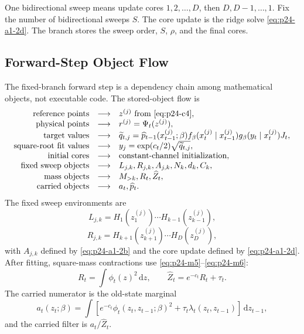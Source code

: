 \documentclass[11pt]{article}
\numberwithin{equation}{section}
\newcommand{\dd}{\,\mathrm d}
\begin{document}
One bidirectional sweep means update cores \(1,2,\ldots,D\), then
\(D,D-1,\ldots,1\).  Fix the number of bidirectional sweeps \(S\).  The core
update is the ridge solve \eqref{eq:p24-a1-2d}.  The branch stores the sweep order, \(S\),
\(\rho\), and the final cores.

\subsection{Forward-Step Object Flow}

The fixed-branch forward step is a dependency chain among mathematical
objects, not executable code.  The stored-object flow is
\begin{equation}
\begin{array}{rcl}
\text{reference points} &\longrightarrow& z^{(j)} \text{ from \eqref{eq:p24-c4}},\\
\text{physical points} &\longrightarrow& r^{(j)}=\Psi_t(z^{(j)}),\\
\text{target values} &\longrightarrow&
    \widetilde q_{t,j}
    =
    \widehat p_{t-1}(x_{t-1}^{(j)};\beta)
    f_\beta(x_t^{(j)}\mid x_{t-1}^{(j)})
    g_\beta(y_t\mid x_t^{(j)})J_t,\\
\text{square-root fit values} &\longrightarrow&
    y_j=\exp(c_t/2)\sqrt{\widetilde q_{t,j}},\\
\text{initial cores} &\longrightarrow&
    \text{constant-channel initialization},\\
\text{fixed sweep objects} &\longrightarrow&
    L_{j,k},R_{j,k},A_{j,k},N_k,d_k,C_k,\\
\text{mass objects} &\longrightarrow&
    M_{>k},R_t,\widehat Z_t,\\
\text{carried objects} &\longrightarrow&
    a_t,\widehat p_t.
\end{array}
\label{eq:p24-c12}
\end{equation}
The fixed sweep environments are
\[
    L_{j,k}=H_1(z_1^{(j)})\cdots H_{k-1}(z_{k-1}^{(j)}),
\]
\[
    R_{j,k}=H_{k+1}(z_{k+1}^{(j)})\cdots H_D(z_D^{(j)}),
\]
with \(A_{j,k}\) defined by \eqref{eq:p24-a1-2b} and the core update defined by \eqref{eq:p24-a1-2d}.
After fitting, square-mass contractions use \eqref{eq:p24-m5}--\eqref{eq:p24-m6}:
\[
    R_t=\int\phi_t(z)^2\dd z,\qquad
    \widehat Z_t=e^{-c_t}R_t+\tau_t.
\]
The carried numerator is the old-state marginal
\[
    a_t(z_t;\beta)
    =
    \int
    \left[e^{-c_t}\phi_t(z_t,z_{t-1};\beta)^2
    +\tau_t\lambda_t(z_t,z_{t-1})\right]\dd z_{t-1},
\]
and the carried filter is \(a_t/\widehat Z_t\).
\end{document}
